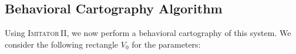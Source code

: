 \documentclass[a4paper,10pt]{article}
\newcommand{\imitatordeux}{\textsc{Imitator}\,II}
\begin{document}
% 
% 
% 
% 
% 
% 
% 
% 
% 
% 
% 
% 
% 
% 
% 
% 

\subsection{Behavioral Cartography Algorithm}


Using \imitatordeux{}, we now perform a behavioral cartography of this system.
We consider the following rectangle $V_0$ for the parameters:
\end{document}
